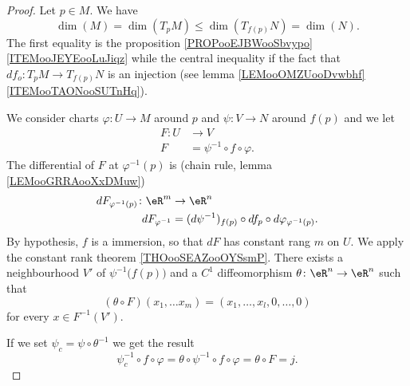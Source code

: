 \begin{proof}
	Let \( p\in M\). We have
	\begin{equation}
		\dim(M)=\dim(T_pM)\leq\dim(T_{f(p)}N)=\dim(N).
	\end{equation}
	The first equality is the proposition \ref{PROPooEJBWooSbvypo}\ref{ITEMooJEYEooLuJiqz} while the central inequality if the fact that \(df_o \colon T_pM\to T_{f(p)}N  \) is an injection (see lemma \ref{LEMooOMZUooDvwbhf}\ref{ITEMooTAONooSUTnHq}).

	We consider charts \( \varphi\colon U\to M  \) around \( p\) and \(\psi \colon V\to N  \) around \( f(p)\) and we let
	\begin{equation}
		\begin{aligned}
			F\colon U & \to V                          \\
			F         & =\psi^{-1}\circ f\circ\varphi.
		\end{aligned}
	\end{equation}
	The differential of \( F\) at \( \varphi^{-1}(p)\) is (chain rule, lemma \ref{LEMooGRRAooXxDMuw})
	\begin{equation}
		\begin{aligned}
			dF_{\varphi^{-1}(p)}\colon \eR^m & \to \eR^n                                                       \\
			dF_{\varphi^{-1}}                & =(d\psi^{-1})_{f(p)}\circ df_p\circ d\varphi_{\varphi^{-1}(p)}.
		\end{aligned}
	\end{equation}
	By hypothesis, \( f\) is a immersion, so that \( dF\) has constant rang \( m\) on \( U\). We apply the constant rank theorem \ref{THOooSEAZooOYSsmP}. There exists a neighbourhood \( V'\) of \( \psi^{-1}\big( f(p) \big)\) and a \( C^1\) diffeomorphism \(\theta \colon \eR^n\to \eR^n  \) such that
	\begin{equation}
		(\theta\circ F)(x_1,\ldots x_m)=(x_1,\ldots,x_l,0,\ldots,0)
	\end{equation}
	for every \( x\in F^{-1}(V')\).

	If we set \( \psi_c=\psi\circ \theta^{-1}\) we get the result
	\begin{equation}
		\psi_c^{-1}\circ f\circ\varphi=\theta\circ\psi^{-1}\circ f\circ\varphi=\theta\circ F=j.
	\end{equation}
\end{proof}


